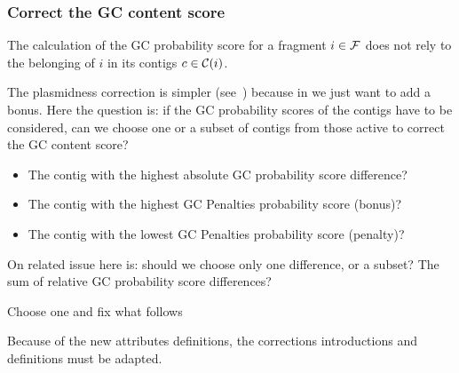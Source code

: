 \subsubsection{Correct the GC content score}\label{sec:method:mgc:fine_tuned}

The calculation of the GC probability score for a fragment \(i \in \mathcal{F}{}\) does not rely to the belonging of \(i\) in its contigs \(c \in \mathcal{C}{}(i)\).

\begin{questionbox}
  The plasmidness correction is simpler (see~) because in we just want to add a bonus.
  Here the question is: if the GC probability scores of the contigs have to be considered, can we choose one or a subset of contigs from those active to correct the GC content score?
  \begin{itemize}
    \item The contig with the highest absolute GC probability score difference?
    \item The contig with the highest GC Penalties probability score (bonus)?
    \item The contig with the lowest GC Penalties probability score (penalty)?
  \end{itemize}
  On related issue here is: should we choose only one difference, or a subset?
  The sum of relative GC probability score differences?

  \begin{todobox}
    Choose one and fix what follows
  \end{todobox}
\end{questionbox}

\begin{fixmebox}
  Because of the new attributes definitions, the corrections introductions and definitions must be adapted.
\end{fixmebox}

